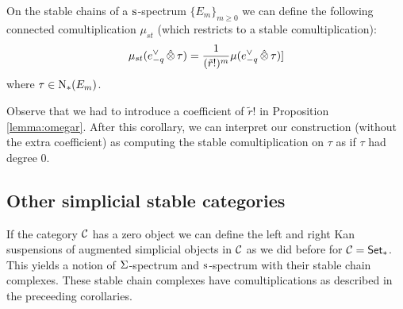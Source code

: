 \begin{corollary}
    On the stable chains of a $\operatorname{s}^{}$-spectrum $\{E_m\}_{m\geq 0}$ we can define the following connected comultiplication $\mu_{st}$ (which restricts to a stable comultiplication):
    \[
        \mu_{st}(e_{-q}^\vee\operatorname{\hat{\otimes}} \tau) = \frac{1}{(\tilde{r}!)^m}\mu(e_{-q}^\vee\operatorname{\hat{\otimes}} \tau)]
    \]
    where $\tau\in\operatorname{N}_{*}(E_m)$.
\end{corollary}
Observe that we had to introduce a coefficient of $\tilde{r}!$ in Proposition \ref{lemma:omegar}. After this corollary, we can interpret our construction (without the extra coefficient) as computing the stable comultiplication on $\tau$ as if $\tau$ had degree $0$.

\subsection{Other simplicial stable categories}

If the category $\mathcal{C}$ has a zero object we can define the left and right Kan suspensions of augmented simplicial objects in $\mathcal{C}$ as we did before for $\mathcal{C} = \mathsf{Set}_*$. This yields a notion of $\Sigma^{}$-spectrum and $\operatorname{s}^{}$-spectrum with their stable chain complexes. These stable chain complexes have comultiplications as described in the preceeding corollaries.
